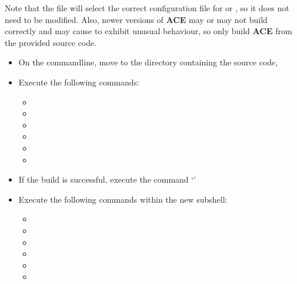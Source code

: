 Note that the file  will select the correct
configuration file for \mac{} or \win{}, so it does not need to be modified.
Also, newer versions of \textbf{ACE} may or may not build correctly and may cause
\mplusm{} to exhibit unusual behaviour, so only build \textbf{ACE} from the provided
source code.
\begin{itemize}
\item On the command\longDash{}line, move to the directory containing the \mplusm{} source
code, 
\item\exSp{}Execute the following commands:
\begin{itemize}
\item {}
\item\exSp{}
\item\exSp{}
\item\exSp{}
\item\exSp{}
\item\exSp{}
\end{itemize}
\item\exSp{}If the build is successful, execute the command `'
\item\exSp{}Execute the following commands within the new subshell:
\begin{itemize}
\item {}
\item\exSp{}
\item\exSp{}
\item\exSp{}
\item\exSp{}
\item\exSp{}
\end{itemize}
\end{itemize}
\tertiaryEnd
{}
